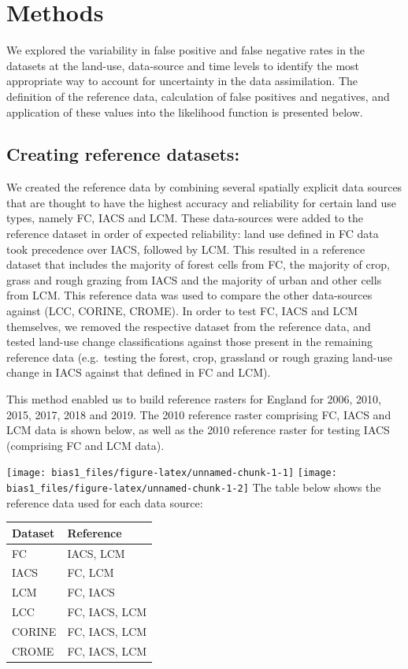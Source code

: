 \documentclass[
]{book}
\begin{document}
\hypertarget{methods-1}{%
\section{Methods}\label{methods-1}}

We explored the variability in false positive and false negative rates in the datasets at the land-use, data-source and time levels to identify the most appropriate way to account for uncertainty in the data assimilation. The definition of the reference data, calculation of false positives and negatives, and application of these values into the likelihood function is presented below.

\hypertarget{creating-reference-datasets}{%
\subsection{Creating reference datasets:}\label{creating-reference-datasets}}

We created the reference data by combining several spatially explicit data sources that are thought to have the highest accuracy and reliability for certain land use types, namely FC, IACS and LCM. These data-sources were added to the reference dataset in order of expected reliability: land use defined in FC data took precedence over IACS, followed by LCM. This resulted in a reference dataset that includes the majority of forest cells from FC, the majority of crop, grass and rough grazing from IACS and the majority of urban and other cells from LCM.
This reference data was used to compare the other data-sources against (LCC, CORINE, CROME). In order to test FC, IACS and LCM themselves, we removed the respective dataset from the reference data, and tested land-use change classifications against those present in the remaining reference data (e.g.~testing the forest, crop, grassland or rough grazing land-use change in IACS against that defined in FC and LCM).

This method enabled us to build reference rasters for England for 2006, 2010, 2015, 2017, 2018 and 2019. The 2010 reference raster comprising FC, IACS and LCM data is shown below, as well as the 2010 reference raster for testing IACS (comprising FC and LCM data).

\texttt{[image: bias1\_files/figure-latex/unnamed-chunk-1-1]} \texttt{[image: bias1\_files/figure-latex/unnamed-chunk-1-2]}
The table below shows the reference data used for each data source:

\begin{tabular}{l|l}
\hline
Dataset & Reference\\
\hline
FC & IACS, LCM\\
\hline
IACS & FC, LCM\\
\hline
LCM & FC, IACS\\
\hline
LCC & FC, IACS, LCM\\
\hline
CORINE & FC, IACS, LCM\\
\hline
CROME & FC, IACS, LCM\\
\hline
\end{tabular}
\end{document}
